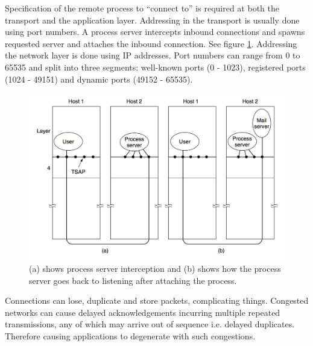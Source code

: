 \documentclass[twoside]{article}
\begin{document}
Specification of the remote process to ``connect to'' is required at both the
transport and the application layer. Addressing in the transport is usually 
done using port numbers. A process server intercepts inbound connections and 
spawns requested server and attaches the inbound connection. See figure 
\ref{fig:process-server}. Addressing the network layer is done using IP 
addresses. Port numbers can range from 0 to 65535 and split into three 
segments: well-known ports (0 - 1023), registered ports (1024 - 49151) and 
dynamic ports (49152 - 65535).
\begin{figure}
  \includegraphics[width=\linewidth]{process-server.png}
  \caption{(a) shows process server interception and (b) shows how the process
  server goes back to listening after attaching the process.}
  \label{fig:process-server}
\end{figure}
Connections can lose, duplicate and store packets, complicating things. 
Congested networks can cause delayed acknowledgements incurring multiple 
repeated transmissions, any of which may arrive out of sequence i.e. delayed
duplicates. Therefore causing applications to degenerate with such congestions.
\end{document}
